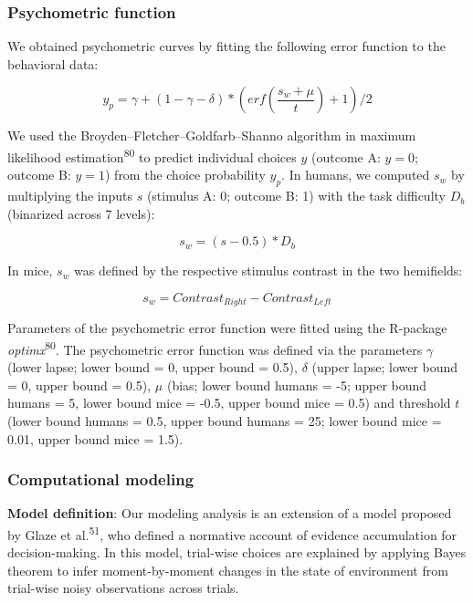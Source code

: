 \documentclass[
]{article}
\begin{document}
\hypertarget{psychometric-function}{%
\subsubsection{Psychometric function}\label{psychometric-function}}

We obtained psychometric curves by fitting the following error function
to the behavioral data:

\begin{equation}
y_p = \gamma + (1 - \gamma - \delta) *  (erf(\frac{s_w + \mu}{t}) + 1) / 2
\end{equation}

We used the Broyden--Fletcher--Goldfarb--Shanno algorithm in maximum
likelihood estimation\textsuperscript{80} to predict individual choices
\(y\) (outcome A: \(y = 0\); outcome B: \(y = 1\)) from the choice
probability \(y_p\). In humans, we computed \(s_w\) by multiplying the
inputs \(s\) (stimulus A: 0; outcome B: 1) with the task difficulty
\(D_b\) (binarized across 7 levels):

\begin{equation}
s_w = (s - 0.5) * D_b
\end{equation}

In mice, \(s_w\) was defined by the respective stimulus contrast in the
two hemifields:

\begin{equation}
s_w = Contrast_{Right} - Contrast_{Left}
\end{equation}

Parameters of the psychometric error function were fitted using the
R-package \emph{optimx}\textsuperscript{80}. The psychometric error
function was defined via the parameters \(\gamma\) (lower lapse; lower
bound = 0, upper bound = 0.5), \(\delta\) (upper lapse; lower bound = 0,
upper bound = 0.5), \(\mu\) (bias; lower bound humans = -5; upper bound
humans = 5, lower bound mice = -0.5, upper bound mice = 0.5) and
threshold \(t\) (lower bound humans = 0.5, upper bound humans = 25;
lower bound mice = 0.01, upper bound mice = 1.5).

\hypertarget{computational-modeling}{%
\subsubsection{Computational modeling}\label{computational-modeling}}

\textbf{Model definition}: Our modeling analysis is an extension of a
model proposed by Glaze et al.\textsuperscript{51}, who defined a
normative account of evidence accumulation for decision-making. In this
model, trial-wise choices are explained by applying Bayes theorem to
infer moment-by-moment changes in the state of environment from
trial-wise noisy observations across trials.
\end{document}
